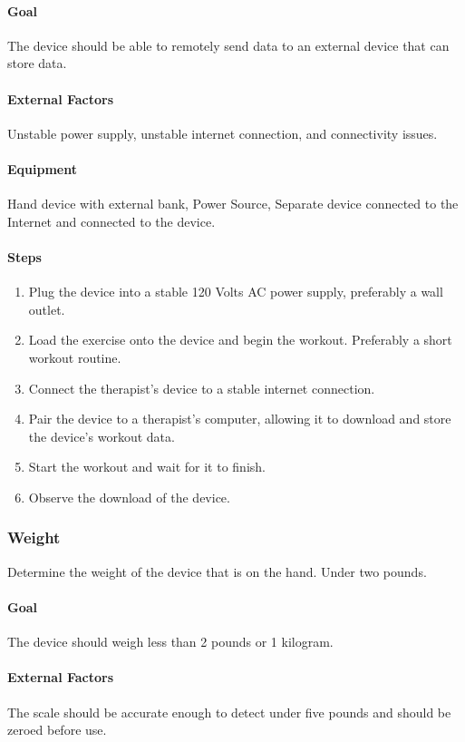 \documentclass{article}
\begin{document}
\paragraph{Goal} The device should be able to remotely send data to an external device that can store data.

\paragraph{External Factors} Unstable power supply, unstable internet connection, and connectivity issues.

\paragraph{Equipment} Hand device with external bank, Power Source, Separate device connected to the Internet and connected to the device.

\paragraph{Steps}
\begin{enumerate}
\item Plug the device into a stable 120 Volts AC power supply, preferably a wall outlet.
\item Load the exercise onto the device and begin the workout. Preferably a short workout routine.
\item Connect the therapist's device to a stable internet connection.
\item Pair the device to a therapist's computer, allowing it to download and store the device's workout data.
\item Start the workout and wait for it to finish.
\item Observe the download of the device.
\end{enumerate}

\subsubsection{Weight}
Determine the weight of the device that is on the hand. Under two pounds.

\paragraph{Goal} The device should weigh less than 2 pounds or 1 kilogram.

\paragraph{External Factors} The scale should be accurate enough to detect under five pounds and should be zeroed before use.
\end{document}
